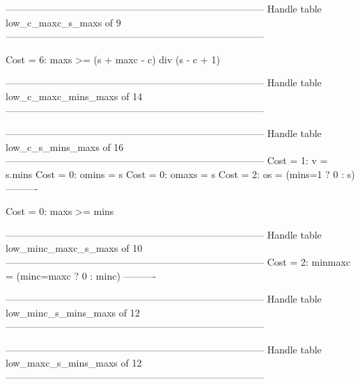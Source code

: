 --------------------------------------------------------------------------------
Handle table low_c_maxc_s_maxs of 9
--------------------------------------------------------------------------------

Cost =  6:  maxs >= (s + maxc - c) div (s - c + 1)

--------------------------------------------------------------------------------
Handle table low_c_maxc_mins_maxs of 14
--------------------------------------------------------------------------------


--------------------------------------------------------------------------------
Handle table low_c_s_mins_maxs of 16
--------------------------------------------------------------------------------
Cost =  1:  v     = s.mins
Cost =  0:  omins = s
Cost =  0:  omaxs = s
Cost =  2:  os    = (mins=1 ? 0 : s)
----------

Cost =  0:  maxs >= mins

--------------------------------------------------------------------------------
Handle table low_minc_maxc_s_maxs of 10
--------------------------------------------------------------------------------
Cost =  2:  minmaxc = (minc=maxc ? 0 : minc)
----------


--------------------------------------------------------------------------------
Handle table low_minc_s_mins_maxs of 12
--------------------------------------------------------------------------------


--------------------------------------------------------------------------------
Handle table low_maxc_s_mins_maxs of 12
--------------------------------------------------------------------------------

